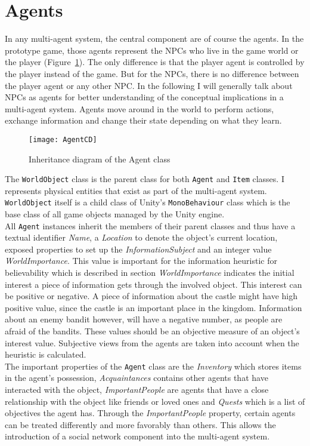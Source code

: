 \section{Agents}
In any multi-agent system, the central component are of course the agents. In the prototype game, those agents represent the NPCs who live in the game world or the player (Figure~\ref{fig:agentCD}). The only difference is that the player agent is controlled by the player instead of the game. But for the NPCs, there is no difference between the player agent or any other NPC. In the following I will generally talk about NPCs as agents for better understanding of the conceptual implications in a multi-agent system. Agents move around in the world to perform actions, exchange information and change their state depending on what they learn.
\begin{figure}
	\centering
	\texttt{[image: AgentCD]}
	\caption{Inheritance diagram of the Agent class}
	\label{fig:agentCD}
\end{figure}
The \verb|WorldObject| class is the parent class for both \verb|Agent| and \verb|Item| classes. I represents physical entities that exist as part of the multi-agent system. \verb|WorldObject| itself is a child class of Unity's \verb|MonoBehaviour| class which is the base class of all game objects managed by the Unity engine.\\
All \verb|Agent| instances inherit the members of their parent classes and thus have a textual identifier \textit{Name}, a \textit{Location} to denote the object's current location, exposed properties to set up the \textit{InformationSubject} and an integer value \textit{WorldImportance}. This value is important for the information heuristic for believability which is described in section %
\textit{WorldImportance} indicates the initial interest a piece of information gets through the involved object. This interest can be positive or negative. A piece of information about the castle might have high positive value, since the castle is an important place in the kingdom. Information about an enemy bandit however, will have a negative number, as people are afraid of the bandits. These values should be an objective measure of an object's interest value. Subjective views from the agents are taken into account when the heuristic is calculated.\\
The important properties of the \verb|Agent| class are the \textit{Inventory} which stores items in the agent's possession, \textit{Acquaintances} contains other agents that have interacted with the object, \textit{ImportantPeople} are agents that have a close relationship with the object like friends or loved ones and \textit{Quests} which is a list of objectives the agent has. Through the \textit{ImportantPeople} property, certain agents can be treated differently and more favorably than others. This allows the introduction of a social network component into the multi-agent system.\\
